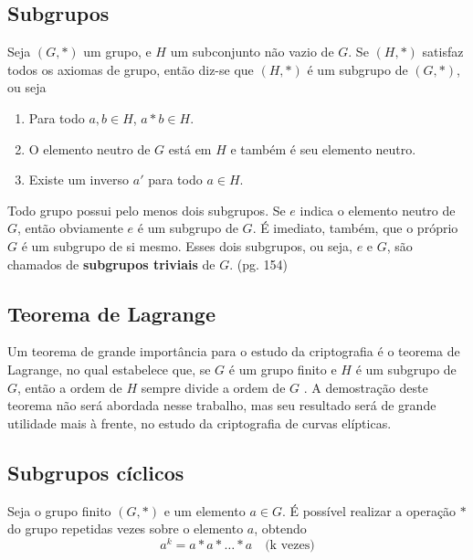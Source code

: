 %
%
\subsection{Subgrupos}
Seja $(G, *)$ um grupo, e \(H\) um subconjunto não vazio de \(G\). Se $(H, *)$ satisfaz todos os axiomas de grupo, então diz-se que $(H, *)$ é um subgrupo de $(G, *)$\cite{Coutinho:2014}, ou seja

\begin{enumerate}
\item Para todo $a, b \in H$, $a * b \in H$.
\item O elemento neutro de \(G\) está em \(H\) e também é seu elemento neutro.
\item Existe um inverso \(a'\) para todo $a \in H$.
\end{enumerate}

Todo grupo possui pelo menos dois subgrupos. Se \(e\) indica o elemento neutro de \(G\), então obviamente \(e\) é um subgrupo de \(G\). É imediato, também, que o próprio \(G\) é um subgrupo de si mesmo. Esses dois subgrupos, ou seja, \(e\) e \(G\), são chamados de \textbf{subgrupos triviais} de \(G\). \cite{Domingues:2003} (pg. 154)

%
%
\subsection{Teorema de Lagrange}
Um teorema de grande importância para o estudo da criptografia é o teorema de Lagrange, no qual estabelece que, se \(G\) é um grupo finito e \(H\) é um subgrupo de \(G\), então a ordem de \(H\) sempre divide a ordem de \(G\) \cite{Shoup:2005}. A demostração deste teorema não será abordada nesse trabalho, mas seu resultado será de grande utilidade mais à frente, no estudo da criptografia de curvas elípticas.

%
%
\subsection{Subgrupos cíclicos}
Seja o grupo finito $(G,*)$ e um elemento $a \in G$. É possível realizar a operação $*$ do grupo repetidas vezes sobre o elemento $a$, obtendo
$$
a^k = a * a * \ldots * a \quad\mbox{(k vezes)}
$$

